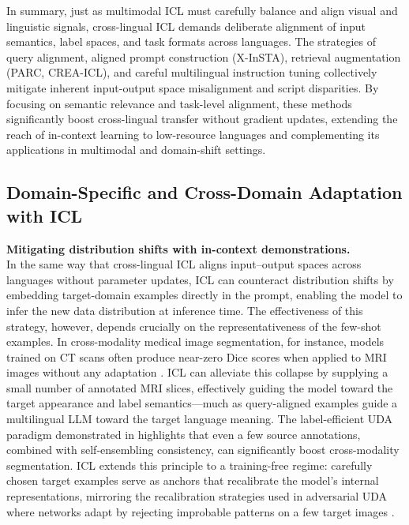 \documentclass[11pt]{article}
\begin{document}
In summary, just as multimodal ICL must carefully balance and align visual and linguistic signals, cross-lingual ICL demands deliberate alignment of input semantics, label spaces, and task formats across languages. The strategies of query alignment, aligned prompt construction (X-InSTA), retrieval augmentation (PARC, CREA-ICL), and careful multilingual instruction tuning collectively mitigate inherent input-output space misalignment and script disparities. By focusing on semantic relevance and task-level alignment, these methods significantly boost cross-lingual transfer without gradient updates, extending the reach of in-context learning to low-resource languages and complementing its applications in multimodal and domain-shift settings.

\subsection{Domain-Specific and Cross-Domain Adaptation with ICL}

\textbf{Mitigating distribution shifts with in-context demonstrations.}\\
In the same way that cross-lingual ICL aligns input--output spaces across languages without parameter updates, ICL can counteract distribution shifts by embedding target-domain examples directly in the prompt, enabling the model to infer the new data distribution at inference time. The effectiveness of this strategy, however, depends crucially on the representativeness of the few-shot examples. In cross-modality medical image segmentation, for instance, models trained on CT scans often produce near-zero Dice scores when applied to MRI images without any adaptation \cite{ref135}. ICL can alleviate this collapse by supplying a small number of annotated MRI slices, effectively guiding the model toward the target appearance and label semantics---much as query-aligned examples guide a multilingual LLM toward the target language meaning. The label-efficient UDA paradigm demonstrated in \cite{ref136} highlights that even a few source annotations, combined with self-ensembling consistency, can significantly boost cross-modality segmentation. ICL extends this principle to a training-free regime: carefully chosen target examples serve as anchors that recalibrate the model's internal representations, mirroring the recalibration strategies used in adversarial UDA where networks adapt by rejecting improbable patterns on a few target images \cite{ref137}.
\end{document}
